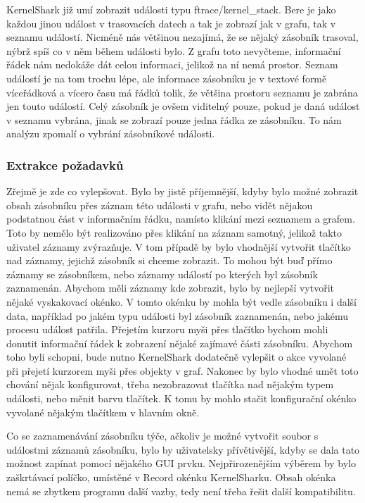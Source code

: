 KernelShark již umí zobrazit události typu ftrace/kernel\_stack. Bere je jako každou jinou událost v trasovacích datech a tak je zobrazí jak v grafu, tak v seznamu událostí. Nicméně nás většinou nezajímá, že se nějaký zásobník trasoval, nýbrž spíš co v něm během události bylo. Z grafu toto nevyčteme, informační řádek nám nedokáže dát celou informaci, jelikož na ní nemá prostor. Seznam událostí je na tom trochu lépe, ale informace zásobníku je v textové formě víceřádková a vícero času má řádků tolik, že většina prostoru seznamu je zabrána jen touto událostí. Celý zásobník je ovšem viditelný pouze, pokud je daná událost v seznamu vybrána, jinak se zobrazí pouze jedna řádka ze zásobníku. To nám analýzu zpomalí o vybrání zásobníkové události.

\subsubsection*{Extrakce požadavků}
Zřejmě je zde co vylepšovat. Bylo by jistě příjemnější, kdyby bylo možné zobrazit obsah zásobníku přes záznam této události v grafu, nebo vidět nějakou podstatnou část v informačním řádku, namísto klikání mezi seznamem a grafem. Toto by nemělo být realizováno přes klikání na záznam samotný, jelikož takto uživatel záznamy zvýrazňuje. V tom případě by bylo vhodnější vytvořit tlačítko nad záznamy, jejichž zásobník si chceme zobrazit. To mohou být buď přímo záznamy se zásobníkem, nebo záznamy událostí po kterých byl zásobník zaznamenán. Abychom měli záznamy kde zobrazit, bylo by nejlepší vytvořit nějaké vyskakovací okénko. V tomto okénku by mohla být vedle zásobníku i další data, například po jakém typu události byl zásobník zaznamenán, nebo jakému procesu událost patřila. Přejetím kurzoru myši přes tlačítko bychom mohli donutit informační řádek k zobrazení nějaké zajímavé části zásobníku. Abychom toho byli schopni, bude nutno KernelShark dodatečně vylepšit o akce vyvolané při přejetí kurzorem myši přes objekty v graf. Nakonec by bylo vhodné umět toto chování nějak konfigurovat, třeba nezobrazovat tlačítka nad nějakým typem události, nebo měnit barvu tlačítek. K tomu by mohlo stačit konfigurační okénko vyvolané nějakým tlačítkem v hlavním okně.

Co se zaznamenávání zásobníku týče, ačkoliv je možné vytvořit soubor s událostmi záznamů zásobníku, bylo by uživatelsky přívětivější, kdyby se dala tato možnost zapínat pomocí nějakého GUI prvku. Nejpřirozenějším výběrem by bylo zaškrtávací políčko, umístěné v Record okénku KernelSharku. Obsah okénka nemá se zbytkem programu další vazby, tedy není třeba řešit další kompatibilitu.   

